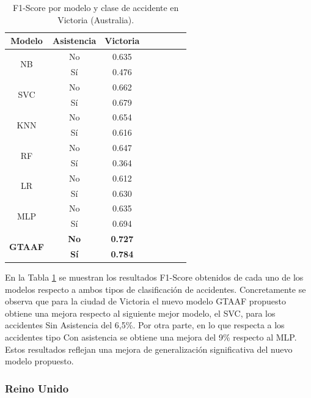 \documentclass{uathesis-es}
\begin{document}
{\begin{table}[H]
\begin{center}
\begin{tabular}{|c|c||c|c|c|c|c|c|}
        \textbf{Modelo} & \textbf{Asistencia} & Victoria
        \\ \hline \hline

        \multirow{2}{*}{NB} &
            No &  0.635 \\ &
            Sí & 0.476 \\ \hline \hline
        \multirow{2}{*}{SVC} &
            No & 0.662 \\ &
            Sí &  0.679 \\ \hline \hline
        \multirow{2}{*}{KNN} &
            No  & 0.654 \\ &
            Sí & 0.616 \\ \hline \hline
        \multirow{2}{*}{RF} &
            No & 0.647 \\ &
            Sí & 0.364  \\ \hline \hline
        \multirow{2}{*}{LR} &
            No &  0.612 \\ &
            Sí & 0.630 \\ \hline \hline
        \multirow{2}{*}{MLP} &
            No & 0.635 \\ &
            Sí & 0.694 \\ \hline \hline
        \multirow{2}{*}{\textbf{GTAAF}} &
            \textbf{No} & \textbf{0.727} \\ &
            \textbf{Sí} & \textbf{0.784} \\ \hline \hline
        \end{tabular}
    \end{center}
    \caption{F1-Score por modelo y clase de accidente en Victoria (Australia).}
    \label{AustraliaMetrics}
\end{table}

En la Tabla \ref{AustraliaMetrics} se muestran los resultados F1-Score obtenidos de cada uno de los modelos respecto a ambos tipos de clasificación de accidentes. Concretamente se observa que para la ciudad de Victoria el nuevo modelo GTAAF propuesto obtiene una mejora respecto al siguiente mejor modelo, el SVC, para los accidentes Sin Asistencia del 6,5\%. Por otra parte, en lo que respecta a los accidentes tipo Con asistencia se obtiene una mejora del 9\% respecto al MLP. Estos resultados reflejan una mejora de generalización significativa del nuevo modelo propuesto.


\subsubsection*{Reino Unido}

}
\end{document}
